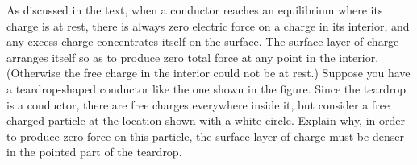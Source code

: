 As discussed in the text, when a conductor reaches an
        equilibrium where its charge is at rest, there is always
        zero electric force on a charge in its interior, and any
        excess charge concentrates itself on the surface.  The
        surface layer of charge arranges itself so as to produce
        zero total force at any point in the interior.  (Otherwise
        the free charge in the interior could not be at rest.) 
        Suppose you have a teardrop-shaped conductor like the one
        shown in the figure.  Since the teardrop is a conductor,
        there are free charges everywhere inside it, but consider a
        free charged particle at the location shown with a white
        circle. Explain why, in order to produce zero force on this
        particle, the surface layer of charge must be denser in the
        pointed part of the teardrop.

